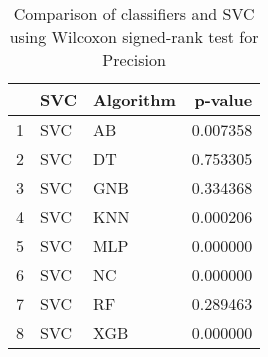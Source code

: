\begin{table}
\footnotesize
\caption{Comparison of classifiers and SVC using Wilcoxon signed-rank test for Precision}
\label{tab:SVC wilcoxon Precision comparison}
\begin{tabular}{lllr}
\hline
 & SVC & Algorithm & p-value \\
\hline
1 & SVC & AB & 0.007358 \\
2 & SVC & DT & 0.753305 \\
3 & SVC & GNB & 0.334368 \\
4 & SVC & KNN & 0.000206 \\
5 & SVC & MLP & 0.000000 \\
6 & SVC & NC & 0.000000 \\
7 & SVC & RF & 0.289463 \\
8 & SVC & XGB & 0.000000 \\
\hline
\end{tabular}
\end{table}
